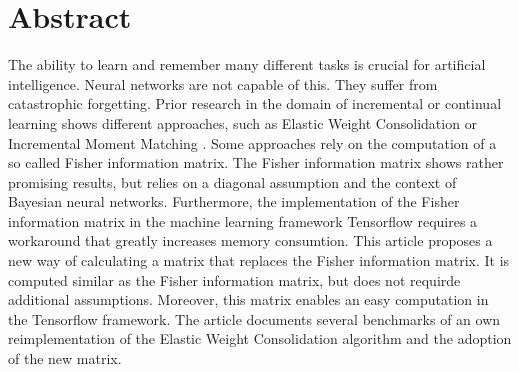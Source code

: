 \chapter*{Abstract}
\label{abstract}

The ability to learn and remember many different tasks is crucial for artificial intelligence.
Neural networks are not capable of this.
They suffer from catastrophic forgetting.
Prior research in the domain of incremental or continual learning shows different approaches, such as Elastic Weight Consolidation \cite{elastic-weight-consolidation} or Incremental Moment Matching \cite{incremental-moment-matching}.
Some approaches rely on the computation of a so called Fisher information matrix.
The Fisher information matrix shows rather promising results, but relies on a diagonal assumption and the context of Bayesian neural networks.
Furthermore, the implementation of the Fisher information matrix in the machine learning framework Tensorflow requires a workaround that greatly increases memory consumtion.
\newline
This article proposes a new way of calculating a matrix that replaces the Fisher information matrix.
It is computed similar as the Fisher information matrix, but does not requirde additional assumptions.
Moreover, this matrix enables an easy computation in the Tensorflow framework.
The article documents several benchmarks of an own reimplementation of the Elastic Weight Consolidation \cite{elastic-weight-consolidation} algorithm and the adoption of the new matrix.
